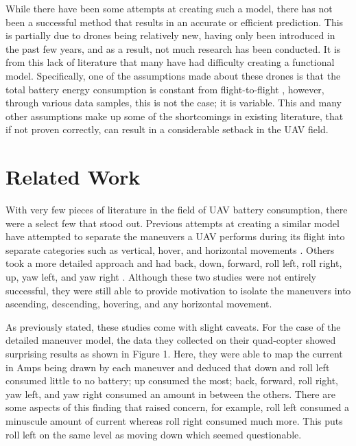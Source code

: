 \documentclass{article}
\begin{document}
While there have been some attempts at creating such a model, there has not been a successful method that results in an accurate or efficient prediction. This is partially due to drones being relatively new, having only been introduced in the past few years, and as a result, not much research has been conducted. It is from this lack of literature that many have had difficulty creating a functional model. Specifically, one of the assumptions made about these drones is that the total battery energy consumption is constant from flight-to-flight \cite{Prasetia}, however, through various data samples, this is not the case; it is variable. This and many other assumptions make up some of the shortcomings in existing literature, that if not proven correctly, can result in a considerable setback in the UAV field. 


\section{Related Work}
With very few pieces of literature in the field of UAV battery consumption, there were a select few that stood out. Previous attempts at creating a similar model have attempted to separate the maneuvers a UAV performs during its flight into separate categories such as vertical, hover, and horizontal movements \cite{Prasetia}. Others took a more detailed approach and had back, down, forward, roll left, roll right, up, yaw left, and yaw right \cite{Corral}. Although these two studies were not entirely successful, they were still able to provide motivation to isolate the maneuvers into ascending, descending, hovering, and any horizontal movement.\par

As previously stated, these studies come with slight caveats. For the case of the detailed maneuver model, the data they collected on their quad-copter showed surprising results as shown in Figure 1. Here, they were able to map the current in Amps being drawn by each maneuver and deduced that down and roll left consumed little to no battery; up consumed the most; back, forward, roll right, yaw left, and yaw right consumed an amount in between the others. There are some aspects of this finding that raised concern, for example, roll left consumed a minuscule amount of current whereas roll right consumed much more. This puts roll left on the same level as moving down which seemed questionable. \par
\end{document}

